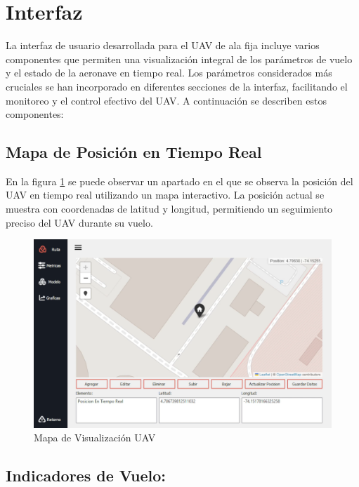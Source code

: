 \section{Interfaz}

La interfaz de usuario desarrollada para el UAV de ala fija incluye varios componentes que permiten una visualización integral de los parámetros de vuelo y el estado de la aeronave en tiempo real. Los parámetros considerados más cruciales se han incorporado en diferentes secciones de la interfaz, facilitando el monitoreo y el control efectivo del UAV. A continuación se describen estos componentes:

\subsection{Mapa de Posición en Tiempo Real}

En la figura \ref{fig:mapa Interfaz } se puede observar un apartado en el que se observa la posición del UAV en tiempo real utilizando un mapa interactivo. La posición actual se muestra con coordenadas de latitud y longitud, permitiendo un seguimiento preciso del UAV durante su vuelo.

\begin{figure}[H]
    \centering
    \includegraphics[width=6 in]{Imagenes/Interfaz/mapa_interfaz.png}
    \caption{Mapa de Visualización UAV}
    \label{fig:mapa Interfaz }
\end{figure}

\subsection{Indicadores de Vuelo:}

